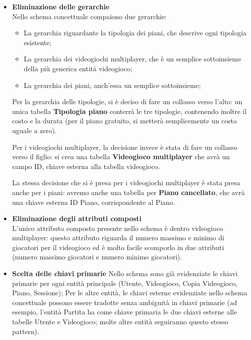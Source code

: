 \documentclass[a4paper,12pt]{report}
\begin{document}
\begin{itemize}

\item \textbf{Eliminazione delle gerarchie} \\
Nello schema concettuale compaiono due gerarchie:
	\begin{itemize}
	\item La gerarchia riguardante la tipologia dei piani, che descrive ogni tipologia esistente;
	\item La gerarchia dei videogiochi multiplayer, che è un semplice sottoinsieme della più generica entità videogioco;
	\item La gerarchia dei piani, anch'essa un semplice sottoinsieme;
	\end{itemize}

Per la gerarchia delle tipologie, si è deciso di fare un collasso verso l'alto: un unica tabella \textbf{Tipologia piano} conterrà le tre tipologie, contenendo inoltre il costo e la durata (per il piano gratuito, si metterà semplicemente un costo uguale a zero).

Per i videogiochi multiplayer, la decisione invece è stata di fare un collasso verso il figlio: si crea una tabella \textbf{Videogioco multiplayer} che avrà un campo ID, chiave esterna alla tabella videogioco.

La stessa decisione che si è presa per i videogiochi multiplayer è stata presa anche per i piani: avremo anche una tabella per \textbf{Piano cancellato}, che avrà una chiave esterna ID Piano, corrispondente al Piano.

\item \textbf{Eliminazione degli attributi composti} \\
L'unico attributo composto presente nello schema è dentro videogioco multiplayer: questo attributo riguarda il numero massimo e minimo di giocatori per il videogioco ed è molto facile scomporlo in due attributi (numero massimo giocatori e numero minimo giocatori).

\item \textbf{Scelta delle chiavi primarie}
Nello schema sono già evidenziate le chiavi primarie per ogni entità principale (Utente, Videogioco, Copia Videogioco, Piano, Sessione); Per le altre entità, le chiavi esterne evidenziate nello schema concettuale possono essere tradotte senza ambiguità in chiavi primarie (ad esempio, l'entità Partita ha come chiave primaria le due chiavi esterne alle tabelle Utente e Videogioco; molte altre entità seguiranno questo stesso pattern).


\end{itemize}
\end{document}
